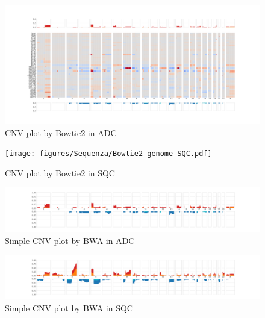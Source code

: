 \documentclass[11pt,a4paper,onecolumn,oneside]{report}
\begin{document}
                \begin{figure}[p]
                    \centering
                    \includegraphics[width=\linewidth]{figures/Sequenza/Bowtie2-genome-ADC.pdf}
                    \caption{CNV plot by Bowtie2 in ADC}
                    \label{fig:CNV-Bowtie2-ADC}
                \end{figure}

                \begin{figure}[p]
                    \centering
                    \texttt{[image: figures/Sequenza/Bowtie2-genome-SQC.pdf]}
                    \caption{CNV plot by Bowtie2 in SQC}
                    \label{fig:CNV-Bowtie2-SQC}
                \end{figure}

                \begin{figure}[p]
                    \centering
                    \includegraphics[width=\linewidth]{figures/Sequenza/BWA-simple-ADC.pdf}
                    \caption{Simple CNV plot by BWA in ADC}
                    \label{fig:SimpleCNV-BWA-ADC}
                \end{figure}

                \begin{figure}[p]
                    \centering
                    \includegraphics[width=\linewidth]{figures/Sequenza/BWA-simple-SQC.pdf}
                    \caption{Simple CNV plot by BWA in SQC}
                    \label{fig:SimpleCNV-BWA-SQC}
                \end{figure}
\end{document}
